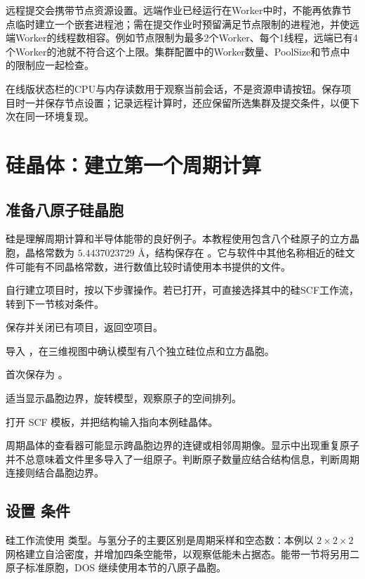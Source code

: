 远程提交会携带节点资源设置。远端作业已经运行在Worker中时，不能再依靠节点临时建立一个嵌套进程池；需在提交作业时预留满足节点限制的进程池，并使远端Worker的线程数相容。例如节点限制为最多2个Worker、每个1线程，远端已有4个Worker的池就不符合这个上限。集群配置中的Worker数量、PoolSize和节点中的限制应一起检查。

在线版状态栏的CPU与内存读数用于观察当前会话，不是资源申请按钮。保存项目时一并保存节点设置；记录远程计算时，还应保留所选集群及提交条件，以便下次在同一环境复现。


\section{硅晶体：建立第一个周期计算}

\subsection{准备八原子硅晶胞}

硅是理解周期计算和半导体能带的良好例子。本教程使用包含八个硅原子的立方晶胞，晶格常数为 $5.4437023729$ Å，结构保存在 。它与软件中其他名称相近的硅文件可能有不同晶格常数，进行数值比较时请使用本书提供的文件。

自行建立项目时，按以下步骤操作。若已打开，可直接选择其中的硅SCF工作流，转到下一节核对条件。

\begin{steps}
\item 保存并关闭已有项目，返回空项目。
\item 导入 ，在三维视图中确认模型有八个独立硅位点和立方晶胞。
\item 首次保存为 。
\item 适当显示晶胞边界，旋转模型，观察原子的空间排列。
\item 打开 SCF 模板，并把结构输入指向本例硅晶体。
\end{steps}

周期晶体的查看器可能显示跨晶胞边界的连键或相邻周期像。显示中出现重复原子并不总意味着文件里多导入了一组原子。判断原子数量应结合结构信息，判断周期连接则结合晶胞边界。


\subsection{设置  条件}

硅工作流使用  类型。与氢分子的主要区别是周期采样和空态数：本例以 $2\times2\times2$ 网格建立自洽密度，并增加四条空能带，以观察低能未占据态。能带一节将另用二原子标准原胞，DOS 继续使用本节的八原子晶胞。

